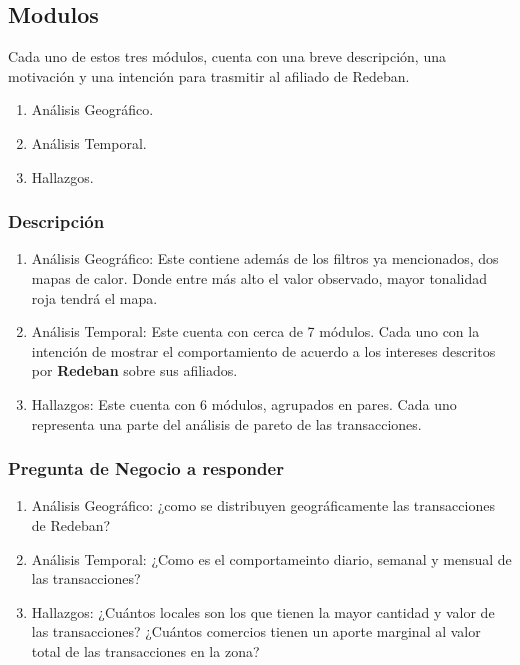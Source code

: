 \documentclass[a4paper]{article}
\begin{document}
\subsection{Modulos}

Cada uno de estos tres módulos, cuenta con una breve descripción, una motivación y una intención para trasmitir al afiliado de Redeban.

\begin{enumerate}
	\item Análisis Geográfico.
	\item Análisis Temporal.
	\item Hallazgos.
\end{enumerate}


\subsubsection{Descripción}

\begin{enumerate}
	\item Análisis Geográfico: Este contiene además de los filtros ya mencionados, dos mapas de calor. Donde entre más alto el valor observado, mayor tonalidad roja tendrá el mapa.
	\item Análisis Temporal: Este cuenta con cerca de 7 módulos. Cada uno con la intención de mostrar el comportamiento de acuerdo a los intereses descritos por \textbf{Redeban} sobre sus afiliados.
	\item Hallazgos: Este cuenta con 6 módulos, agrupados en pares. Cada uno representa una parte del análisis de pareto de las transacciones.
\end{enumerate}

\subsubsection{Pregunta de Negocio a responder}

\begin{enumerate}
	\item Análisis Geográfico: ¿como se distribuyen geográficamente las transacciones de Redeban?
	\item Análisis Temporal: ¿Como es el comportameinto diario, semanal y  mensual de las transacciones?
	\item Hallazgos: ¿Cuántos locales son los que tienen la mayor cantidad y valor de las transacciones? ¿Cuántos comercios tienen un aporte marginal al valor total de las transacciones en la zona?
\end{enumerate}
\end{document}
